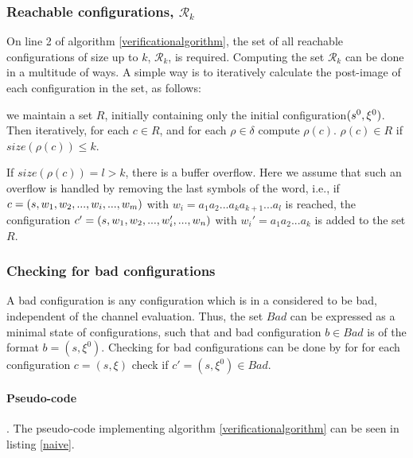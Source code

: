 \subsubsection{Reachable configurations, $\mathcal{R}_k$}
\label{part2}
On line 2 of algorithm \ref{verificationalgorithm}, the set of all reachable configurations of size up to $k$, $\mathcal{R}_k$, is required. Computing the set $\mathcal{R}_k$ can be done in a multitude of ways. A simple way is to iteratively calculate the post-image of each configuration in the set, as follows:

we maintain a set $R$, initially containing only the initial configuration$(s^0, \xi^0)$. Then iteratively, for each $c \in R$, and for each $\rho \in \delta$ compute $\rho(c)$. $\rho(c) \in R$ if  $size(\rho(c)) \leq k$.

If $size(\rho(c)) = l > k$, there is a buffer overflow. Here we assume that such an overflow is handled by removing the last symbols of the word, i.e., if $c = (s, w_1, w_2,..., w_i, ...,  w_m)$ with $w_i = a_1a_2...a_ka_{k+1}...a_l$ is reached, the configuration $c' = (s, w_1, w_2, ..., w_i', ..., w_n)$ with $w_i' = a_1a_2...a_k$ is added to the set $R$.

\subsubsection{Checking for bad configurations}
\label{part3}
A bad configuration is any configuration which is in a  considered to be bad, independent of the channel evaluation. Thus, the set $Bad$ can be expressed as a minimal state of configurations, such that and bad configuration $b \in Bad$ is of the format $b = (s, \xi^0)$. Checking for bad configurations can be done by for for each configuration $c = (s, \xi)$ check if $c' = (s, \xi^0) \in Bad$.


\paragraph{Pseudo-code}.
The pseudo-code implementing algorithm \ref{verificationalgorithm} can be seen in listing \ref{naive}. 

